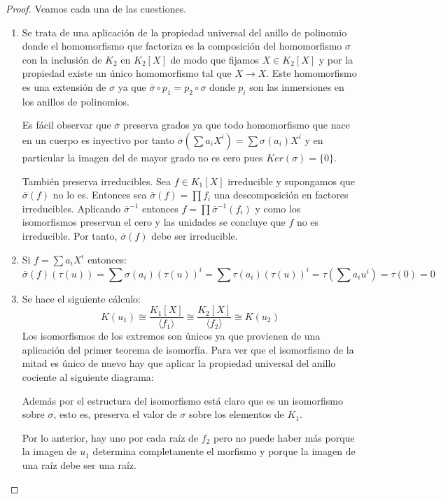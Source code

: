 \begin{proof}
	Veamos cada una de las cuestiones. 
	
	\begin{enumerate}
		\item Se trata de una aplicación de la propiedad universal del anillo de polinomio donde el homomorfismo que factoriza es la composición del homomorfismo $\sigma$ con la inclusión de $K_2$ en $K_2[X]$ de modo que fijamos $X \in K_2[X]$ y por la propiedad existe un único homomorfismo tal que $X \to X$. Este homomorfismo es una extensión de $\sigma$ ya que $\overline{\sigma} \circ p_1 = p_2 \circ \sigma$ donde $p_i$ son las inmersiones en los anillos de polinomios. 
		
		Es fácil observar que $\overline{\sigma}$ preserva grados ya que todo homomorfismo que nace en un cuerpo es inyectivo por tanto $\overline{\sigma}(\sum a_iX^i) = \sum \sigma(a_i)X^i$ y en particular la imagen del de mayor grado no es cero pues $Ker(\sigma) = \{0\}$. 
		
		También preserva irreducibles. Sea $f \in K_1[X]$ irreducible y supongamos que $\overline{\sigma}(f)$ no lo es. Entonces sea $\overline{\sigma}(f) = \prod f_i$ una descomposición en factores irreducibles. Aplicando $\overline{\sigma}^{-1}$ entonces $f = \prod \overline{\sigma}^{-1}(f_i)$ y como los isomorfismos preservan el cero y las unidades se concluye que $f$ no es irreducible. Por tanto, $\overline{\sigma}(f)$ debe ser irreducible. 
		\item Si $f = \sum a_iX^i$ entonces: $$\overline{\sigma}(f)(\tau(u)) = \sum \sigma(a_i)(\tau(u))^i = \sum \tau(a_i)(\tau(u))^i = \tau(\sum a_iu^i) = \tau(0) = 0$$		
		\item Se hace el siguiente cálculo: $$K(u_1) \cong \frac{K_1[X]}{\langle f_1 \rangle} \cong \frac{K_2[X]}{\langle f_2 \rangle} \cong K(u_2)$$ Los isomorfismos de los extremos son únicos ya que provienen de una aplicación del primer teorema de isomorfía. Para ver que el isomorfismo de la mitad es único de nuevo hay que aplicar la propiedad universal del anillo cociente al siguiente diagrama:
		
		Además por el estructura del isomorfismo está claro que es un isomorfismo sobre $\sigma$, esto es, preserva el valor de $\sigma$ sobre los elementos de $K_1$. 
		
		Por lo anterior, hay uno por cada raíz de $f_2$ pero no puede haber más porque la imagen de $u_1$ determina completamente el morfismo y porque la imagen de una raíz debe ser una raíz. 
	\end{enumerate}
\end{proof}

